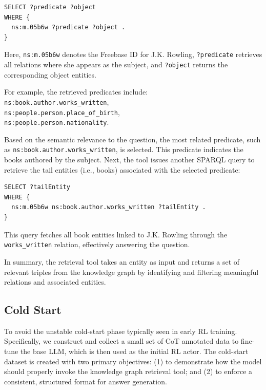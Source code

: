 \documentclass[10pt,conference]{IEEEtran}
\begin{document}
\begin{lstlisting}[style=sparql]
SELECT ?predicate ?object
WHERE {
  ns:m.05b6w ?predicate ?object .
}
\end{lstlisting}

\noindent
Here, \verb|ns:m.05b6w| denotes the Freebase ID for J.K. Rowling, \verb|?predicate| retrieves all relations where she appears as the subject, and \verb|?object| returns the corresponding object entities. 

For example, the retrieved predicates include: \\
\hspace*{1.5em} \verb|ns:book.author.works_written|, \\
\hspace*{1.5em} \verb|ns:people.person.place_of_birth|, \\
\hspace*{1.5em} \verb|ns:people.person.nationality|. 

Based on the semantic relevance to the question, the most related predicate, such as \verb|ns:book.author.works_written|, is selected. This predicate indicates the books authored by the subject.
Next, the tool issues another SPARQL query to retrieve the tail entities (i.e., books) associated with the selected predicate:

\begin{lstlisting}[style=sparql]
SELECT ?tailEntity
WHERE {
  ns:m.05b6w ns:book.author.works_written ?tailEntity .
}
\end{lstlisting}

\noindent
This query fetches all book entities linked to J.K. Rowling through the \texttt{works\_written} relation, effectively answering the question.

In summary, the retrieval tool takes an entity as input and returns a set of relevant triples from the knowledge graph by identifying and filtering meaningful relations and associated entities.

\subsection{Cold Start}

To avoid the unstable cold-start phase typically seen in early RL training. Specifically, we construct and collect a small set of CoT annotated data to fine-tune the base LLM, which is then used as the initial RL actor. The cold-start dataset is created with two primary objectives: (1) to demonstrate how the model should properly invoke the knowledge graph retrieval tool; and (2) to enforce a consistent, structured format for answer generation.
\end{document}
